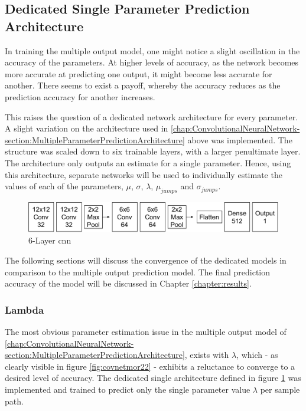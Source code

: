 \documentclass[11pt,oneside,openany,a4paper,english, report, goldenblock
]{usthesis}
\begin{document}
\subsection{Dedicated Single Parameter Prediction Architecture}
\label{chap:ConvolutionalNeuralNetwork-section:SingleParameterPredictionArchitecture}
In training the multiple output model, one might notice a slight oscillation in the accuracy of the parameters. At higher levels of accuracy, as the network becomes more accurate at predicting one output, it might become less accurate for another. There seems to exist a payoff, whereby the accuracy reduces as the prediction accuracy for another increases.

This raises the question of a dedicated network architecture for every parameter. A slight variation on the architecture used in \ref{chap:ConvolutionalNeuralNetwork-section:MultipleParameterPredictionArchitecture} above was implemented. The structure was scaled down to six trainable layers, with a larger penultimate layer. The architecture only outputs an estimate for a single parameter. Hence, using this architecture, separate networks will be used to individually estimate the values of each of the parameters, $\mu$, $\sigma$, $\lambda$, $\mu_{jumps}$ and $\sigma_{jumps}$.

\begin{figure}[h]
	\centering
	\includegraphics[width=0.75\linewidth]{Images/Diagrams/Network-Structures/SingleParameterDedicatedCNN}
	\caption[Dedicated Single Parameter Prediction \acrshort{cnn}]{6-Layer \acrshort{cnn}}
	\label{fig:singleparameterdedicatedcnn}
\end{figure}

The following sections will discuss the convergence of the dedicated models in comparison to the multiple output prediction model. The final prediction accuracy of the model will be discussed in Chapter \ref{chapter:results}.

\subsubsection{Lambda}

The most obvious parameter estimation issue in the multiple output model of \ref{chap:ConvolutionalNeuralNetwork-section:MultipleParameterPredictionArchitecture}, exists with $\lambda$, which - as clearly visible in figure \ref{fig:covnetmor22} - exhibits a reluctance to converge to a desired level of accuracy. The dedicated single architecture defined in figure \ref{fig:singleparameterdedicatedcnn} was implemented and trained to predict only the single parameter value $\lambda$ per sample path. 
\end{document}
